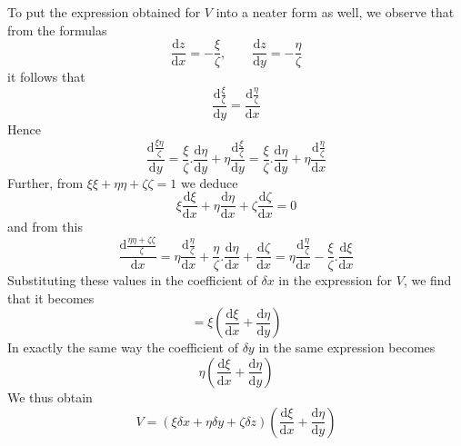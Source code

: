 To put the expression obtained for $V$ into a neater form as well, we observe that from the formulas
\[
\frac{\mathrm{d}z}{\mathrm{d}x}=-\frac{\xi}{\zeta},\qquad \frac{\mathrm{d}z}{\mathrm{d}y}=-\frac{\eta}{\zeta}
\]
it follows that
\[
\frac{\mathrm{d}\frac{\xi}{\zeta}}{\mathrm{d}y}=\frac{\mathrm{d}\frac{\eta}{\zeta}}{\mathrm{d}x}
\]
Hence
\[
\frac{\mathrm{d}\frac{\xi\eta}{\zeta}}{\mathrm{d}y}=\frac{\xi}{\zeta}.\frac{\mathrm{d}\eta}{\mathrm{d}y}+\eta\frac{\mathrm{d}\frac{\xi}{\zeta}}{\mathrm{d}y}=\frac{\xi}{\zeta}.\frac{\mathrm{d}\eta}{\mathrm{d}y}+\eta\frac{\mathrm{d}\frac{\eta}{\zeta}}{\mathrm{d}x}
\]
Further, from $\xi\xi+\eta\eta+\zeta\zeta=1$ we deduce
\[
\xi\frac{\mathrm{d}\xi}{\mathrm{d}x}+\eta\frac{\mathrm{d}\eta}{\mathrm{d}x}+\zeta\frac{\mathrm{d}\zeta}{\mathrm{d}x}=0
\]
and from this
\[
\frac{\mathrm{d}\frac{\eta\eta+\zeta\zeta}{\zeta}}{\mathrm{d}x}=\eta\frac{\mathrm{d}\frac{\eta}{\zeta}}{\mathrm{d}x}+\frac{\eta}{\zeta}.\frac{\mathrm{d}\eta}{\mathrm{d}x}+\frac{\mathrm{d}\zeta}{\mathrm{d}x}=\eta\frac{\mathrm{d}\frac{\eta}{\zeta}}{\mathrm{d}x}-\frac{\xi}{\zeta}.\frac{\mathrm{d}\xi}{\mathrm{d}x}
\]
Substituting these values in the coefficient of $\delta x$ in the expression for $V$, we find that it becomes
\[
=\xi(\frac{\mathrm{d}\xi}{\mathrm{d}x}+\frac{\mathrm{d}\eta}{\mathrm{d}y})
\]
In exactly the same way the coefficient of $\delta y$ in the same expression becomes
\[
\eta(\frac{\mathrm{d}\xi}{\mathrm{d}x}+\frac{\mathrm{d}\eta}{\mathrm{d}y})
\]
We thus obtain
\[
V=(\xi\delta x+\eta\delta y+\zeta\delta z)(\frac{\mathrm{d}\xi}{\mathrm{d}x}+\frac{\mathrm{d}\eta}{\mathrm{d}y})
\]

